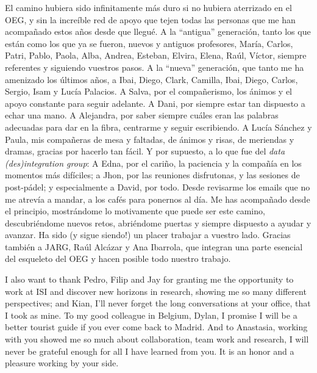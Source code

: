 El camino hubiera sido infinitamente más duro si no hubiera aterrizado en el OEG, y sin la increíble red de apoyo que tejen todas las personas que me han acompañado estos años desde que llegué. 
A la ``antigua'' generación, tanto los que están como los que ya se fueron, nuevos y antiguos profesores, María, Carlos, Patri, Pablo, Paola, Alba, Andrea, Esteban, Elvira, Elena, Raúl, Víctor, siempre referentes y siguiendo vuestros pasos. %
A la ``nueva'' generación, que tanto me ha amenizado los últimos años, a Ibai, Diego, Clark, Camilla, Ibai, Diego, Carlos, Sergio, Isam y Lucía Palacios. 
A Salva, por el compañerismo, los ánimos y el apoyo constante para seguir adelante.
A Dani, por siempre estar tan dispuesto a echar una mano.
A Alejandra, por saber siempre cuáles eran las palabras adecuadas para dar en la fibra, centrarme y seguir escribiendo.
A Lucía Sánchez y Paula, mis compañeras de mesa y faltadas, de ánimos y risas, de meriendas y dramas, gracias por hacerlo tan fácil. 
Y por supuesto, a lo que fue del \textit{data (des)integration group}: 
A Edna, por el cariño, la paciencia y la compañía en los momentos más difíciles; 
a Jhon, por las reuniones disfrutonas, y las sesiones de post-pádel;
y especialmente a David, por todo. Desde revisarme los emails que no me atrevía a mandar, a los cafés para ponernos al día. 
Me has acompañado desde el principio, mostrándome lo motivamente que puede ser este camino, descubriéndome nuevos retos, abriéndome puertas y siempre dispuesto a ayudar y avanzar. 
Ha sido (y sigue siendo!) un placer trabajar a vuestro lado.
Gracias también a JARG, Raúl Alcázar y Ana Ibarrola, que integran una parte esencial del esqueleto del OEG y hacen posible todo nuestro trabajo. 

I also want to thank Pedro, Filip and Jay for granting me the opportunity to work at ISI and discover new horizons in research, showing me so many different perspectives; and Kian, I'll never forget the long conversations at your office, that I took as mine. 
To my good colleague in Belgium, Dylan, I promise I will be a better tourist guide if you ever come back to Madrid. 
And to Anastasia, working with you showed me so much about collaboration, team work and research, I will never be grateful enough for all I have learned from you. It is an honor and a pleasure working by your side. 

